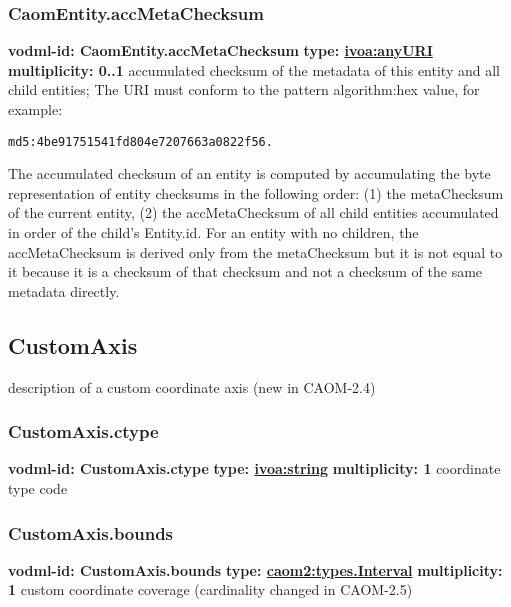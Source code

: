     \subsubsection{CaomEntity.accMetaChecksum}
      \textbf{vodml-id: CaomEntity.accMetaChecksum} \newline
      \textbf{type: \hyperref[sect:ivoa]{ivoa:anyURI}} \newline
      \textbf{multiplicity: 0..1} \newline
      accumulated checksum of the metadata of this entity and all child entities; The URI must conform to the pattern {algorithm}:{hex value}, for example: \begin{verbatim}md5:4be91751541fd804e7207663a0822f56.\end{verbatim} The accumulated checksum of an entity is computed by accumulating the byte representation of entity checksums in the following order: (1) the metaChecksum of the current entity, (2) the accMetaChecksum of all child entities accumulated in order of the child's Entity.id. For an entity with no children, the accMetaChecksum is derived only from the metaChecksum but it is not equal to it because it is a checksum of that checksum and not a checksum of the same metadata directly.

  \subsection{CustomAxis}
  \label{sect:CustomAxis}
    description of a custom coordinate axis (new in CAOM-2.4)

    \subsubsection{CustomAxis.ctype}
      \textbf{vodml-id: CustomAxis.ctype} \newline
      \textbf{type: \hyperref[sect:ivoa]{ivoa:string}} \newline
      \textbf{multiplicity: 1} \newline
      coordinate type code

    \subsubsection{CustomAxis.bounds}
      \textbf{vodml-id: CustomAxis.bounds} \newline
      \textbf{type: \hyperref[sect:types.Interval]{caom2:types.Interval}} \newline
      \textbf{multiplicity: 1} \newline
      custom coordinate coverage (cardinality changed in CAOM-2.5)

